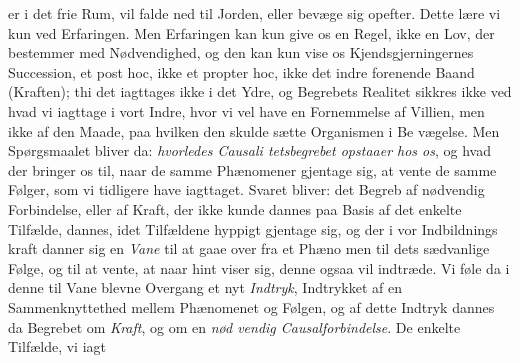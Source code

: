 \documentclass[12pt,a4paper]{book}
\begin{document}
er i det frie Rum, vil falde ned til Jorden, eller bevæge sig
opefter. Dette lære vi kun ved Erfaringen. Men Erfaringen
kan kun give os en Regel, ikke en Lov, der bestemmer med
Nødvendighed, og den kan kun vise os Kjendsgjerningernes
Succession, et post hoc, ikke et propter hoc, ikke det indre
forenende Baand (Kraften); thi det iagttages ikke i det Ydre,
og Begrebets Realitet sikkres ikke ved hvad vi iagttage i vort
Indre, hvor vi vel have en Fornemmelse af Villien, men ikke
af den Maade, paa hvilken den skulde sætte Organismen i Be\-%
vægelse. Men Spørgsmaalet bliver da: \emph{hvorledes Causali\-%
tetsbegrebet opstaaer hos os}, og hvad der bringer os
til, naar de samme Phænomener gjentage sig, at vente de
samme Følger, som vi tidligere have iagttaget. Svaret bliver:
det Begreb af nødvendig Forbindelse, eller af Kraft, der ikke
kunde dannes paa Basis af det enkelte Tilfælde, dannes, idet
Tilfældene hyppigt gjentage sig, og der i vor Indbildnings\-%
kraft danner sig en \emph{Vane} til at gaae over fra et Phæno\-%
men til dets sædvanlige Følge, og til at vente, at naar hint
viser sig, denne ogsaa vil indtræde. Vi føle da i denne til
Vane blevne Overgang et nyt \emph{Indtryk}, Indtrykket af en
Sammenknyttethed mellem Phænomenet og Følgen, og af dette
Indtryk dannes da Begrebet om \emph{Kraft}, og om en \emph{nød\-%
vendig Causalforbindelse}. De enkelte Tilfælde, vi iagt\-%
\end{document}
